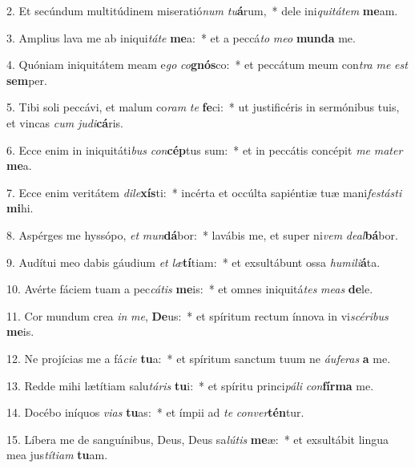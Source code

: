 2. Et secúndum multitúdinem miseratió\textit{num} \textit{tu}\textbf{á}rum,~*  dele ini\textit{qui}\textit{tá}\textit{tem} \textbf{me}am.\

3. Amplius lava me ab iniqui\textit{tá}\textit{te} \textbf{me}a:~*  et a peccá\textit{to} \textit{me}\textit{o} \textbf{mun}\textbf{da} me.\

4. Quóniam iniquitátem meam e\textit{go} \textit{co}\textbf{gnós}co:~*  et peccátum meum con\textit{tra} \textit{me} \textit{est} \textbf{sem}per.\

5. Tibi soli peccávi, et malum co\textit{ram} \textit{te} \textbf{fe}ci:~*  ut justificéris in sermónibus tuis, et vincas \textit{cum} \textit{ju}\textit{di}\textbf{cá}ris.\

6. Ecce enim in iniquitáti\textit{bus} \textit{con}\textbf{cép}tus sum:~*  et in peccátis concépit \textit{me} \textit{ma}\textit{ter} \textbf{me}a.\

7. Ecce enim veritátem \textit{di}\textit{le}\textbf{xís}ti:~*  incérta et occúlta sapiéntiæ tuæ mani\textit{fes}\textit{tás}\textit{ti} \textbf{mi}hi.\

8. Aspérges me hyssópo, \textit{et} \textit{mun}\textbf{dá}bor:~*  lavábis me, et super ni\textit{vem} \textit{de}\textit{al}\textbf{bá}bor.\

9. Audítui meo dabis gáudium \textit{et} \textit{læ}\textbf{tí}tiam:~*  et exsultábunt ossa \textit{hu}\textit{mi}\textit{li}\textbf{á}ta.\

10. Avérte fáciem tuam a pec\textit{cá}\textit{tis} \textbf{me}is:~*  et omnes iniquitá\textit{tes} \textit{me}\textit{as} \textbf{de}le.\

11. Cor mundum crea \textit{in} \textit{me}, \textbf{De}us:~*  et spíritum rectum ínnova in vi\textit{scé}\textit{ri}\textit{bus} \textbf{me}is.\

12. Ne projícias me a fá\textit{ci}\textit{e} \textbf{tu}a:~*  et spíritum sanctum tuum ne \textit{áu}\textit{fe}\textit{ras} \textbf{a} me.\

13. Redde mihi lætítiam salu\textit{tá}\textit{ris} \textbf{tu}i:~*  et spíritu princi\textit{pá}\textit{li} \textit{con}\textbf{fír}\textbf{ma} me.\

14. Docébo iníquos \textit{vi}\textit{as} \textbf{tu}as:~*  et ímpii ad \textit{te} \textit{con}\textit{ver}\textbf{tén}tur.\

15. Líbera me de sanguínibus, Deus, Deus sa\textit{lú}\textit{tis} \textbf{me}æ:~*  et exsultábit lingua mea jus\textit{tí}\textit{ti}\textit{am} \textbf{tu}am.\


